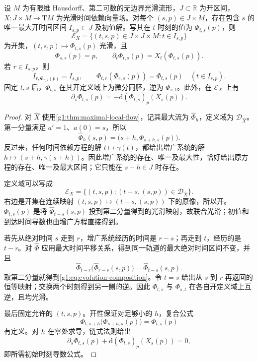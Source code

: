 \begin{proposition}
	\label{g1:prop:time-dependent-evolution}
	设 \(M\) 为有限维 Hausdorff、第二可数的无边界光滑流形，\(J\subset\mathbb R\) 为开区间，\(X:J\times M\to \mathrm{T}M\) 为光滑时间依赖向量场。对每个 \((s,p)\in J\times M\)，存在包含 \(s\) 的唯一最大开时间区间 \(I_{s,p}\subset J\) 及初值解。写其在 \(t\) 时刻的值为 \(\Phi_{t,s}(p)\)，则
	\[
		\mathcal E_X=\{(t,s,p)\in J\times J\times M:t\in I_{s,p}\}
	\]
	为开集，\((t,s,p)\mapsto\Phi_{t,s}(p)\) 光滑，且
	\begin{equation}
		\label{g1:eq:evolution-initial-value}
		\Phi_{s,s}(p)=p,\qquad
		\partial_t\Phi_{t,s}(p)=X_t(\Phi_{t,s}(p)).
	\end{equation}
	若 \(r\in I_{s,p}\)，则
	\begin{equation}
		\label{g1:eq:evolution-composition}
		I_{r,\Phi_{r,s}(p)}=I_{s,p},\qquad
		\Phi_{t,r}(\Phi_{r,s}(p))=\Phi_{t,s}(p)\quad(t\in I_{s,p}).
	\end{equation}
	固定 \(t,s\) 后，\(\Phi_{t,s}\) 在其开定义域上为微分同胚，逆为 \(\Phi_{s,t}\)。此外，在 \(\mathcal E_X\) 上有
	\begin{equation}
		\label{g1:eq:evolution-initial-time-derivative}
		\partial_s\Phi_{t,s}(p)
		=-\mathrm{d}(\Phi_{t,s})_p(X_s(p)).
	\end{equation}
\end{proposition}
\begin{proof}
	对 \(\widehat X\) 使用\cref{g1:thm:maximal-local-flow}，记其最大流为 \(\widehat\Phi_h\)，定义域为 \(\mathcal D_{\widehat X}\)。第一分量满足 \(a'=1\)、\(a(0)=s\)，所以
	\[
		\widehat\Phi_h(s,p)=\bigl(s+h,\Phi_{s+h,s}(p)\bigr).
	\]
	反过来，任何时间依赖方程的解 \(t\mapsto\gamma(t)\)，都给出增广系统的解 \(h\mapsto(s+h,\gamma(s+h))\)。因此增广系统的存在、唯一及最大性，恰好给出原方程的存在、唯一及最大区间；它只能在 \(s+h\in J\) 时存在。

	定义域可以写成
	\[
		\mathcal E_X=\{(t,s,p):(t-s,(s,p))\in\mathcal D_{\widehat X}\}.
	\]
	右边是开集在连续映射 \((t,s,p)\mapsto(t-s,(s,p))\) 下的原像，所以开。\(\Phi_{t,s}(p)\) 是将 \(\widehat\Phi_{t-s}(s,p)\) 投到第二分量得到的光滑映射，故联合光滑；初值和到达时间导数也由增广方程直接得到。

	若先从绝对时间 \(s\) 走到 \(r\)，增广系统经历的时间是 \(r-s\)；再走到 \(t\)，经历的是 \(t-r\)。对 \(\widehat\Phi\) 应用最大时间平移关系，得到同一轨道的最大绝对时间区间不变，并且
	\[
		\widehat\Phi_{t-r}\bigl(\widehat\Phi_{r-s}(s,p)\bigr)
		=\widehat\Phi_{t-s}(s,p).
	\]
	取第二分量就得到\eqref{g1:eq:evolution-composition}。令 \(t=s\) 给出从 \(s\) 到 \(r\) 再返回的恒等映射；交换两个时刻得到另一侧的逆。因此 \(\Phi_{t,s}\) 与 \(\Phi_{s,t}\) 在各自开定义域上互逆，且均光滑。

	最后固定允许的 \((t,s,p)\)。开性保证对足够小的 \(h\)，复合公式
	\[
		\Phi_{t,s+h}\bigl(\Phi_{s+h,s}(p)\bigr)=\Phi_{t,s}(p)
	\]
	有定义。对 \(h\) 在零处求导，链式法则给出
	\[
		\partial_s\Phi_{t,s}(p)+\mathrm{d}(\Phi_{t,s})_p(X_s(p))=0,
	\]
	即所需初始时刻导数公式。
\end{proof}

